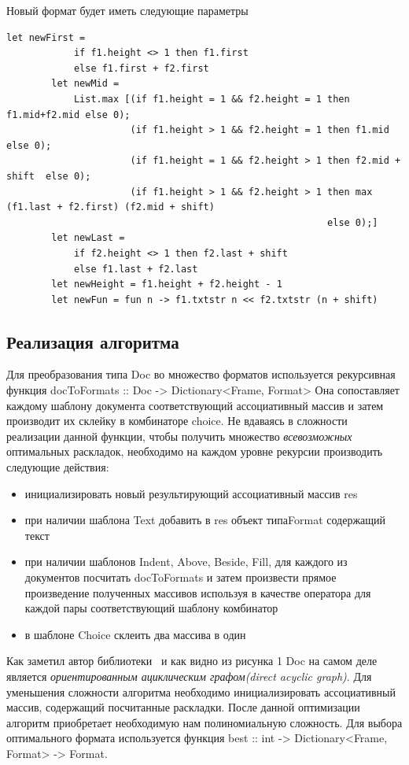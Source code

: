 \documentclass{matmex-diploma}
\begin{document}
Новый формат будет иметь следующие параметры
\begin{lstlisting}
let newFirst = 
            if f1.height <> 1 then f1.first
            else f1.first + f2.first
        let newMid =
            List.max [(if f1.height = 1 && f2.height = 1 then f1.mid+f2.mid else 0);
                      (if f1.height > 1 && f2.height = 1 then f1.mid          else 0); 
                      (if f1.height = 1 && f2.height > 1 then f2.mid + shift  else 0);
                      (if f1.height > 1 && f2.height > 1 then max (f1.last + f2.first) (f2.mid + shift) 
                                                         else 0);]
        let newLast = 
            if f2.height <> 1 then f2.last + shift
            else f1.last + f2.last
        let newHeight = f1.height + f2.height - 1
        let newFun = fun n -> f1.txtstr n << f2.txtstr (n + shift)
\end{lstlisting}
\subsection{Реализация алгоритма}
Для преобразования типа Doc во множество форматов используется рекурсивная функция  docToFormats :: Doc -> Dictionary<Frame, Format>
Она сопоставляет каждому шаблону документа соответствующий ассоциативный массив и затем производит их склейку в комбинаторе choice.
Не вдаваясь в сложности реализации данной функции, чтобы получить множество \textit{всевозможных} оптимальных раскладок, необходимо на каждом уровне рекурсии производить следующие действия: 
\begin{itemize}
    \item инициализировать новый результирующий ассоциативный массив res
    \item при наличии шаблона Text добавить в res объект типаFormat содержащий текст
    \item при наличии шаблонов Indent, Above, Beside, Fill, для каждого из документов посчитать docToFormats и затем произвести прямое произведение полученных массивов используя в качестве оператора для каждой пары  соответствующий шаблону комбинатор
    \item в  шаблоне Choice склеить два массива в один
\end{itemize}
Как заметил автор библиотеки~\cite{podkopaevD} и как видно из рисунка 1 Doc на самом деле является \textit{ориентированным ациклическим графом(direct acyclic graph)}. Для уменьшения сложности алгоритма необходимо инициализировать ассоциативный массив, содержащий  посчитанные раскладки. После данной оптимизации алгоритм приобретает необходимую нам полиномиальную сложность.
Для выбора оптимального формата используется функция 
best :: int -> Dictionary<Frame, Format> -> Format.
\end{document}
